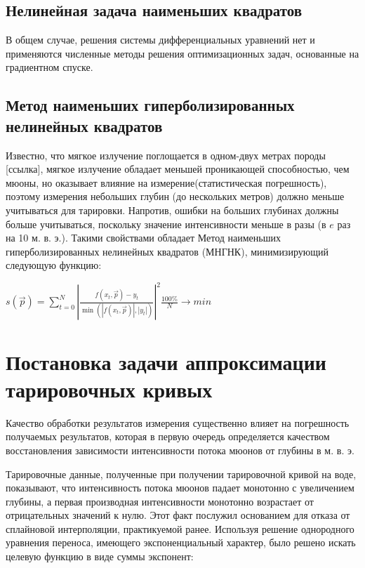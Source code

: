 \subsection{Нелинейная задача наименьших квадратов}


В общем случае, решения системы дифференциальных уравнений нет и 
применяются численные методы решения оптимизационных задач, 
основанные на градиентном спуске.

\subsection{Метод наименьших гиперболизированных \\ нелинейных  квадратов}
Известно, что  мягкое излучение поглощается в одном-двух метрах породы [ссылка], мягкое излучение обладает
меньшей проникающей способностью, чем мюоны, но оказывает влияние на измерение(статистическая погрешность),
поэтому измерения небольших глубин (до нескольких метров) должно меньше учитываться для тарировки. 
Напротив, ошибки на больших глубинах должны больше учитываться, поскольку значение интенсивности  меньше в разы
(в $e$ раз на 10 м. в. э.). Такими свойствами обладает Метод наименьших гиперболизированных нелинейных  квадратов (МНГНК), минимизирующий следующую функцию: 

\begin{center}
$s(\vec{p}) = \displaystyle\sum_{t=0}^N \left|
\frac{f(x_t, \vec{p}) - y_t}{\min(\left|f(x_t, \vec{p})\right|, \left|y_t\right|)}\right|^2 
\frac{100\%}{N} \rightarrow min$ %
 
\end{center}


\section{Постановка задачи аппроксимации тарировочных кривых}\label{sect2_2}

Качество обработки результатов измерения существенно влияет на погрешность
получаемых результатов, которая в первую очередь определяется
качеством восстановления зависимости интенсивности потока мюонов от глубины в м. в. э.

Тарировочные данные, полученные при получении тарировочной кривой на воде, 
показывают, что интенсивность потока мюонов падает монотонно с увеличением
глубины, а первая производная интенсивности монотонно возрастает 
от отрицательных значений к нулю. Этот факт послужил основанием для отказа 
от сплайновой интерполяции, практикуемой ранее. Используя решение 
однородного уравнения переноса, имеющего экспоненциальный характер, было решено
искать целевую функцию в виде суммы экспонент:

